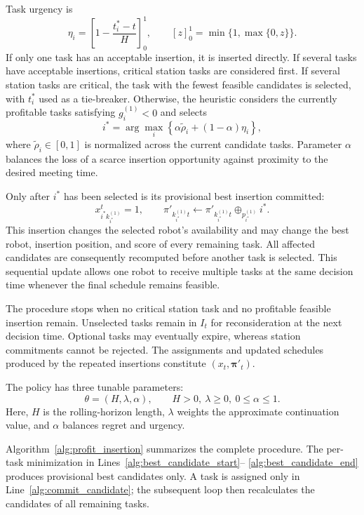 \documentclass[11pt,oneside]{article}
\begin{document}
Task urgency is
\[
\eta_i
=
\left[
1-\frac{t_i^*-t}{H}
\right]_0^1,
\qquad
[z]_0^1=\min\{1,\max\{0,z\}\}.
\]
If only one task has an acceptable insertion, it is inserted directly. If
several tasks have acceptable insertions, critical station tasks are
considered first. If several station tasks are critical, the task with the
fewest feasible candidates is selected, with \(t_i^*\) used as a tie-breaker.
Otherwise, the heuristic considers the currently profitable tasks satisfying
\(g_i^{(1)}<0\) and selects
\[
i^*
=
\arg\max_i
\left\{
\alpha\widetilde\rho_i+(1-\alpha)\eta_i
\right\},
\]
where \(\widetilde\rho_i\in[0,1]\) is normalized across the current candidate
tasks. Parameter \(\alpha\) balances the loss of a scarce insertion
opportunity against proximity to the desired meeting time.

Only after \(i^*\) has been selected is its provisional best insertion
committed:
\[
x_{i^*k_{i^*}^{(1)}}^t=1,
\qquad
\pi'_{k_{i^*}^{(1)}t}
\leftarrow
\pi'_{k_{i^*}^{(1)}t}\oplus_{p_{i^*}^{(1)}}i^*.
\]
This insertion changes the selected robot's availability and may change the
best robot, insertion position, and score of every remaining task. All
affected candidates are consequently recomputed before another task is
selected. This sequential update allows one robot to receive multiple tasks
at the same decision time whenever the final schedule remains feasible.

The procedure stops when no critical station task and no profitable feasible
insertion remain. Unselected tasks remain in \(I_t\) for reconsideration at
the next decision time. Optional tasks may eventually expire, whereas station
commitments cannot be rejected. The assignments and updated schedules
produced by the repeated insertions constitute
\((x_t,\boldsymbol{\pi}'_t)\).

The policy has three tunable parameters:
\[
\theta=(H,\lambda,\alpha),
\qquad
H>0,\ \lambda\geq0,\ 0\leq\alpha\leq1.
\]
Here, \(H\) is the rolling-horizon length, \(\lambda\) weights the approximate
continuation value, and \(\alpha\) balances regret and urgency.

Algorithm~\ref{alg:profit_insertion} summarizes the complete procedure. The
per-task minimization in Lines~\ref{alg:best_candidate_start}--%
\ref{alg:best_candidate_end} produces provisional best candidates only. A
task is assigned only in Line~\ref{alg:commit_candidate}; the subsequent loop
then recalculates the candidates of all remaining tasks.
\end{document}
